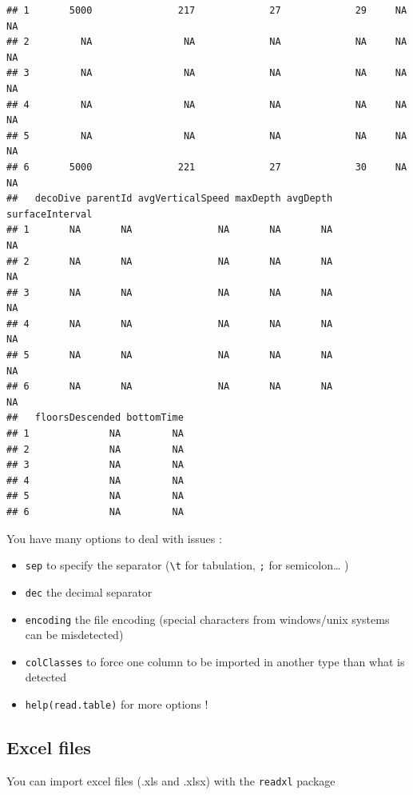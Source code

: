 \documentclass[
]{book}
\providecommand{\tightlist}{%
  \setlength{\itemsep}{0pt}\setlength{\parskip}{0pt}}
\begin{document}
\begin{verbatim}
## 1       5000               217             27             29     NA        NA
## 2         NA                NA             NA             NA     NA        NA
## 3         NA                NA             NA             NA     NA        NA
## 4         NA                NA             NA             NA     NA        NA
## 5         NA                NA             NA             NA     NA        NA
## 6       5000               221             27             30     NA        NA
##   decoDive parentId avgVerticalSpeed maxDepth avgDepth surfaceInterval
## 1       NA       NA               NA       NA       NA              NA
## 2       NA       NA               NA       NA       NA              NA
## 3       NA       NA               NA       NA       NA              NA
## 4       NA       NA               NA       NA       NA              NA
## 5       NA       NA               NA       NA       NA              NA
## 6       NA       NA               NA       NA       NA              NA
##   floorsDescended bottomTime
## 1              NA         NA
## 2              NA         NA
## 3              NA         NA
## 4              NA         NA
## 5              NA         NA
## 6              NA         NA
\end{verbatim}

You have many options to deal with issues :

\begin{itemize}
\tightlist
\item
  \texttt{sep} to specify the separator (\texttt{\textbackslash{}t} for tabulation, \texttt{\textquotesingle{};\textquotesingle{}} for semicolon\ldots{} )
\item
  \texttt{dec} the decimal separator
\item
  \texttt{encoding} the file encoding (special characters from windows/unix systems can be misdetected)
\item
  \texttt{colClasses} to force one column to be imported in another type than what is detected
\item
  \texttt{help(read.table)} for more options !
\end{itemize}

\hypertarget{excel-files}{%
\subsection{Excel files}\label{excel-files}}

You can import excel files (.xls and .xlsx) with the \texttt{readxl} package
\end{document}
